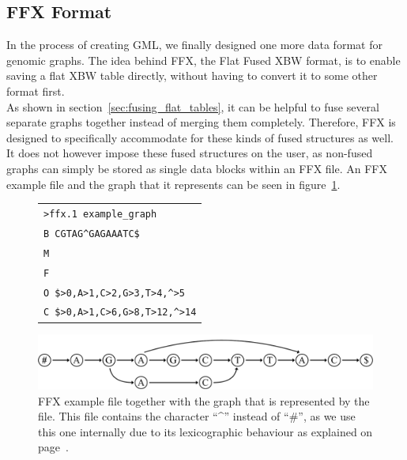 \documentclass[a4paper,12pt,twoside,BCOR=10mm]{scrbook}
\begin{document}
\subsection{FFX Format}

In the process of creating GML, we finally designed one more data format for
genomic graphs. The idea behind FFX, the Flat Fused XBW format, is to enable saving
a flat XBW table directly, without having to convert it to some other format
first. \\
As shown in section~\ref{sec:fusing_flat_tables},
it can be helpful to fuse several separate graphs together
instead of merging them completely. Therefore, FFX is designed
to specifically accommodate for these kinds of fused structures as well.
It does not however impose these fused structures on the user,
as non-fused graphs can simply be stored as single data blocks within
an FFX file.
An FFX example file and the graph that it represents can be seen in figure~\ref{fig:evo_fig_ffx_example}.

\begin{figure}[!htb]
\centering
\begin{tabularx}{1.0\textwidth}{ | X | }
\hline
\texttt{>ffx.1 example\_graph} \\
\texttt{B \quad CGTAG{\textasciicircum}GAGAAATC\$} \\
\texttt{M \quad 111111111001111} \\
\texttt{F \quad 111011111011111} \\
\texttt{O \quad \$>0,A>1,C>2,G>3,T>4,{\textasciicircum}>5} \\
\texttt{C \quad \$>0,A>1,C>6,G>8,T>12,{\textasciicircum}>14} \\
\hline
\end{tabularx}
\includegraphics[width=\textwidth]{evo_fig_ffx_example.pdf}
\caption[FFX example file]{FFX example file together with the graph that is represented by the file. This file contains the character “{\textasciicircum}” instead of “$\#$”, as we use this one internally due to its lexicographic behaviour as explained on page~\pageref{hat_instead_of_hashtag}.} \label{fig:evo_fig_ffx_example}
\end{figure}
\end{document}

